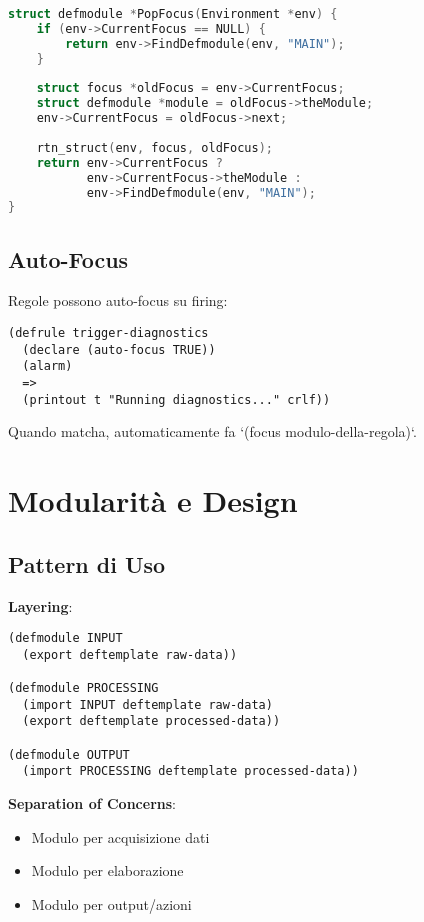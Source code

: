 \begin{lstlisting}[language=C]
struct defmodule *PopFocus(Environment *env) {
    if (env->CurrentFocus == NULL) {
        return env->FindDefmodule(env, "MAIN");
    }
    
    struct focus *oldFocus = env->CurrentFocus;
    struct defmodule *module = oldFocus->theModule;
    env->CurrentFocus = oldFocus->next;
    
    rtn_struct(env, focus, oldFocus);
    return env->CurrentFocus ? 
           env->CurrentFocus->theModule : 
           env->FindDefmodule(env, "MAIN");
}
\end{lstlisting}

\subsection{Auto-Focus}

Regole possono auto-focus su firing:

\begin{lstlisting}[language=CLIPS]
(defrule trigger-diagnostics
  (declare (auto-focus TRUE))
  (alarm)
  =>
  (printout t "Running diagnostics..." crlf))
\end{lstlisting}

Quando matcha, automaticamente fa `(focus modulo-della-regola)`.

\section{Modularità e Design}

\subsection{Pattern di Uso}

\textbf{Layering}:
\begin{lstlisting}[language=CLIPS]
(defmodule INPUT
  (export deftemplate raw-data))

(defmodule PROCESSING
  (import INPUT deftemplate raw-data)
  (export deftemplate processed-data))

(defmodule OUTPUT
  (import PROCESSING deftemplate processed-data))
\end{lstlisting}

\textbf{Separation of Concerns}:
\begin{itemize}
\item Modulo per acquisizione dati
\item Modulo per elaborazione
\item Modulo per output/azioni
\end{itemize}

